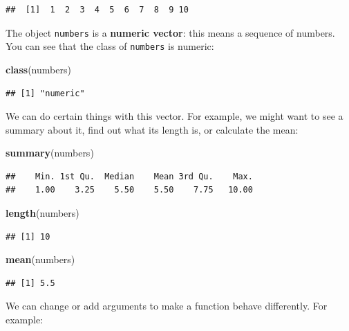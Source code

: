 \documentclass[
]{book}
\newenvironment{Shaded}{\begin{snugshade}}{\end{snugshade}}
\newcommand{\KeywordTok}[1]{\textcolor[rgb]{0.13,0.29,0.53}{\textbf{#1}}}
\newcommand{\NormalTok}[1]{#1}
\begin{document}
\begin{verbatim}
##  [1]  1  2  3  4  5  6  7  8  9 10
\end{verbatim}

The object \texttt{numbers} is a \textbf{numeric vector}: this means a sequence of
numbers. You can see that the class of \texttt{numbers} is numeric:

\begin{Shaded}
\begin{Highlighting}[]
\KeywordTok{class}\NormalTok{(numbers)}
\end{Highlighting}
\end{Shaded}

\begin{verbatim}
## [1] "numeric"
\end{verbatim}

We can do certain things with this vector. For example, we might want to see a
summary about it, find out what its length is, or calculate the mean:

\begin{Shaded}
\begin{Highlighting}[]
\KeywordTok{summary}\NormalTok{(numbers)}
\end{Highlighting}
\end{Shaded}

\begin{verbatim}
##    Min. 1st Qu.  Median    Mean 3rd Qu.    Max. 
##    1.00    3.25    5.50    5.50    7.75   10.00
\end{verbatim}

\begin{Shaded}
\begin{Highlighting}[]
\KeywordTok{length}\NormalTok{(numbers)}
\end{Highlighting}
\end{Shaded}

\begin{verbatim}
## [1] 10
\end{verbatim}

\begin{Shaded}
\begin{Highlighting}[]
\KeywordTok{mean}\NormalTok{(numbers)}
\end{Highlighting}
\end{Shaded}

\begin{verbatim}
## [1] 5.5
\end{verbatim}

We can change or add arguments to make a function behave differently. For example:
\end{document}
